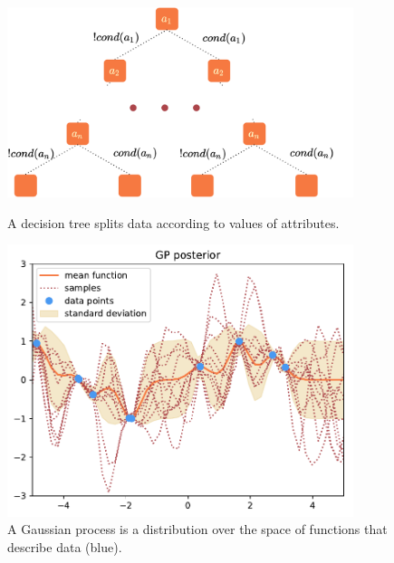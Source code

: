 \documentclass[a4paper,cleardoubleempty,BCOR1cm, 11pt]{report}
\begin{document}
\begin{figure}
	\centering
	\begin{minipage}[t]{0.45\textwidth}
		\centering
		\includegraphics[width=0.9\textwidth,height=0.16\textheight]{images/decisiontree.pdf} 
		\caption{A decision tree splits data according to values of attributes.}
		\label{fig:decision_tree}
	\end{minipage}\hfill
	\begin{minipage}[t]{0.45\textwidth}
		\centering
		\includegraphics[width=0.9\textwidth,height=0.16\textheight]{images/post.pdf}
		
		\caption{A Gaussian process is a distribution over the space of functions that describe data (blue).}
	\end{minipage}
\end{figure}
\end{document}
